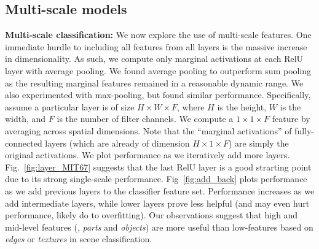 \documentclass[10pt,twocolumn,letterpaper]{article}
\begin{document}
\subsection{Multi-scale models} 
{\bf Multi-scale classification:} We now explore the use of multi-scale features. One immediate hurdle to including all features from all layers is the massive increase in dimensionality. As such, we compute only marginal activations at each RelU layer with average pooling. We found average pooling to outperform sum pooling as the resulting marginal features remained in a reasonable dynamic range. We also experimented with max-pooling, but found similar performance. Specifically, assume a particular layer is of size $H \times W \times F$, where $H$ is the height, $W$ is the width, and $F$ is the number of filter channels. We compute a $1 \times 1 \times F$ feature by averaging across spatial dimensions. Note that the ``marginal activations'' of fully-connected layers (which are already of dimension $H \times 1 \times F$) are simply the original activations. We plot performance as we iteratively add more layers. Fig.~\ref{fig:layer_MIT67} suggests that the last RelU layer is a good strarting point due to its strong single-scale performance. Fig~\ref{fig:add_back} plots performance as we add previous layers to the classifier feature set. Performance increases as we add intermediate layers, while lower layers prove less helpful (and may even hurt performance, likely do to overfitting). Our observations suggest that high and mid-level features (\ie, \textit{parts} and \textit{objects}) are more useful than low-features based on \textit{edges} or \textit{textures} in scene classification. 



\end{document}
